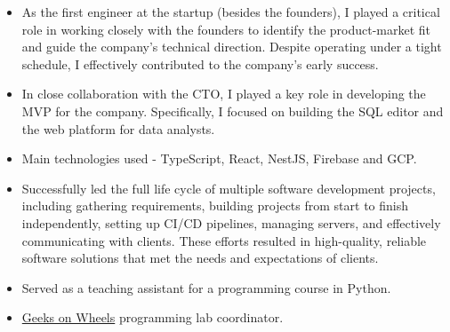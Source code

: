 \documentclass[10pt,a4paper,ragged2e]{altacv}
\begin{document}
\divider

\begin{itemize}
\item As the first engineer at the startup (besides the founders), I played a critical role in working closely with the founders to identify the product-market fit and guide the company's technical direction. Despite operating under a tight schedule, I effectively contributed to the company's early success.
\smallskip
\item In close collaboration with the CTO, I played a key role in developing the MVP for the company. Specifically, I focused on building the SQL editor and the web platform for data analysts.
\smallskip
\item Main technologies used - TypeScript, React, NestJS, Firebase and GCP.
\end{itemize}

\divider

\begin{itemize}
\item Successfully led the full life cycle of multiple software development projects, including gathering requirements, building projects from start to finish independently, setting up CI/CD pipelines, managing servers, and effectively communicating with clients. These efforts resulted in high-quality, reliable software solutions that met the needs and expectations of clients.
\end{itemize}


\begin{itemize}
\item Served as a teaching assistant for a programming course in Python.
\smallskip
\item \href{https://www.geeksonwheels.eu/}{Geeks on Wheels} programming lab coordinator.
\end{itemize}



\end{document}
